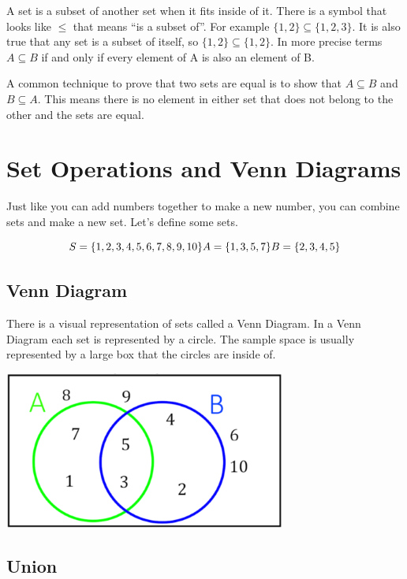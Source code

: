 \documentclass[
]{book}
\begin{document}
A set is a subset of another set when it fits inside of it. There is a symbol that looks like \(\leq\) that means ``is a subset of''. For example \(\{1,2\} \subseteq \{1,2,3\}\). It is also true that any set is a subset of itself, so \(\{1,2\} \subseteq \{1,2\}\). In more precise terms \(A \subseteq B\) if and only if every element of A is also an element of B.

A common technique to prove that two sets are equal is to show that \(A \subseteq B\) and \(B \subseteq A\). This means there is no element in either set that does not belong to the other and the sets are equal.

\hypertarget{set-operations-and-venn-diagrams}{%
\section{Set Operations and Venn Diagrams}\label{set-operations-and-venn-diagrams}}

Just like you can add numbers together to make a new number, you can combine sets and make a new set. Let's define some sets.

\[S = \{1,2,3,4,5,6,7,8,9,10\} \\
 A = \{1,3,5,7\} \\
 B = \{2,3,4,5\}\]

\hypertarget{venn-diagram}{%
\subsection{Venn Diagram}\label{venn-diagram}}

There is a visual representation of sets called a Venn Diagram. In a Venn Diagram each set is represented by a circle. The sample space is usually represented by a large box that the circles are inside of.

\includegraphics{Pictures/01-Sets/Venn.PNG}

\hypertarget{union}{%
\subsection{Union}\label{union}}
\end{document}
